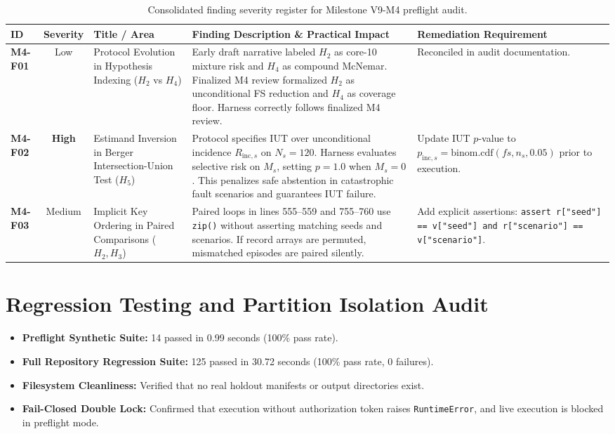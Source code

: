 \documentclass[10pt,a4paper]{article}
\begin{document}
\begin{table}[h!]
\centering
\small
\begin{tabularx}{\textwidth}{p{1.2cm}cp{3.8cm}Xp{2.2cm}}
\toprule
\textbf{ID} & \textbf{Severity} & \textbf{Title / Area} & \textbf{Finding Description \& Practical Impact} & \textbf{Remediation Requirement} \\
\midrule
\textbf{M4-F01} & Low & Protocol Evolution in Hypothesis Indexing ($H_2$ vs $H_4$) & Early draft narrative labeled $H_2$ as core-10 mixture risk and $H_4$ as compound McNemar. Finalized M4 review formalized $H_2$ as unconditional FS reduction and $H_4$ as coverage floor. Harness correctly follows finalized M4 review. & Reconciled in audit documentation. \\
\addlinespace
\textbf{M4-F02} & \textbf{High} & Estimand Inversion in Berger Intersection-Union Test ($H_5$) & Protocol specifies IUT over unconditional incidence $R_{\mathrm{inc}, s}$ on $N_s=120$. Harness evaluates selective risk on $M_s$, setting $p=1.0$ when $M_s=0$. This penalizes safe abstention in catastrophic fault scenarios and guarantees IUT failure. & Update IUT $p$-value to $p_{\mathrm{inc}, s} = \mathrm{binom.cdf}(fs, n_s, 0.05)$ prior to execution. \\
\addlinespace
\textbf{M4-F03} & Medium & Implicit Key Ordering in Paired Comparisons ($H_2, H_3$) & Paired loops in lines 555--559 and 755--760 use \texttt{zip()} without asserting matching seeds and scenarios. If record arrays are permuted, mismatched episodes are paired silently. & Add explicit assertions: \texttt{assert r["seed"] == v["seed"] and r["scenario"] == v["scenario"]}. \\
\bottomrule
\end{tabularx}
\caption{Consolidated finding severity register for Milestone V9-M4 preflight audit.}
\label{tab:severity}
\end{table}

\section{Regression Testing and Partition Isolation Audit}
\begin{itemize}
    \item \textbf{Preflight Synthetic Suite:} 14 passed in 0.99 seconds (100\% pass rate).
    \item \textbf{Full Repository Regression Suite:} 125 passed in 30.72 seconds (100\% pass rate, 0 failures).
    \item \textbf{Filesystem Cleanliness:} Verified that no real holdout manifests or output directories exist.
    \item \textbf{Fail-Closed Double Lock:} Confirmed that execution without authorization token raises \texttt{RuntimeError}, and live execution is blocked in preflight mode.
\end{itemize}
\end{document}
